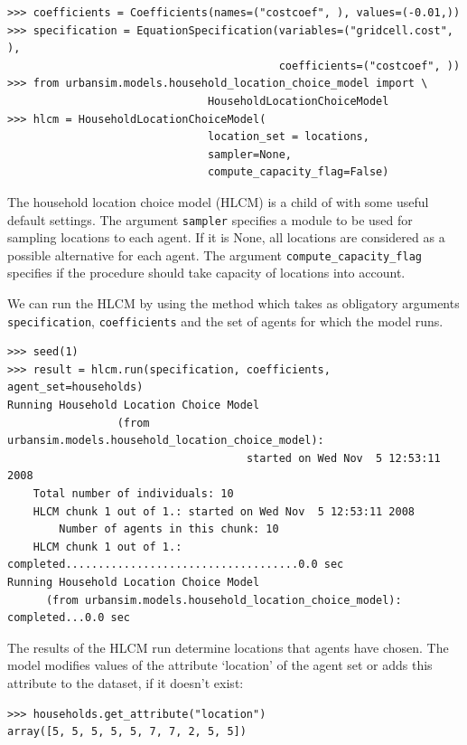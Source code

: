 \coefficientsindex \variablesindex
\begin{verbatim}
>>> coefficients = Coefficients(names=("costcoef", ), values=(-0.01,))
>>> specification = EquationSpecification(variables=("gridcell.cost", ),
                                          coefficients=("costcoef", ))
>>> from urbansim.models.household_location_choice_model import \
                               HouseholdLocationChoiceModel
>>> hlcm = HouseholdLocationChoiceModel(
                               location_set = locations,
                               sampler=None,
                               compute_capacity_flag=False)
\end{verbatim}
The household location choice model (HLCM) is a child of 
 with some useful default settings.  
The argument \verb|sampler| specifies a module to be
used for sampling locations to each agent. If it is None, all locations are
considered as a possible alternative for each agent.  The argument
\verb|compute_capacity_flag| specifies if the procedure should take capacity of
locations into account.

We can run the HLCM by using the method 
which takes as obligatory arguments \verb|specification|, \verb|coefficients| \coefficientsindex
and the set of agents for which the model runs.  
\coefficientsindex
\begin{verbatim}
>>> seed(1)
>>> result = hlcm.run(specification, coefficients, agent_set=households)
Running Household Location Choice Model 
                 (from urbansim.models.household_location_choice_model): 
                                     started on Wed Nov  5 12:53:11 2008
    Total number of individuals: 10
    HLCM chunk 1 out of 1.: started on Wed Nov  5 12:53:11 2008
        Number of agents in this chunk: 10
    HLCM chunk 1 out of 1.: completed....................................0.0 sec
Running Household Location Choice Model 
      (from urbansim.models.household_location_choice_model): completed...0.0 sec

\end{verbatim}

The results of the HLCM run determine locations that
agents have chosen. The model modifies values of the attribute \attributesindex `location' of
the agent set or adds this attribute \attributesindex to the dataset, \datasetindex if it doesn't exist:
\attributesindex
\begin{verbatim}
>>> households.get_attribute("location")
array([5, 5, 5, 5, 5, 7, 7, 2, 5, 5])
\end{verbatim}

